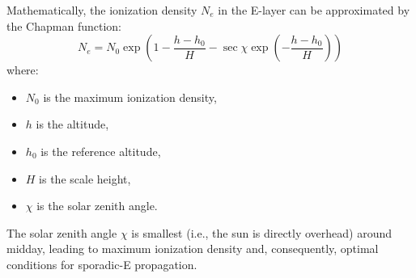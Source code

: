 Mathematically, the ionization density \( N_e \) in the E-layer can be approximated by the Chapman function:
\[ N_e = N_0 \exp\left(1 - \frac{h - h_0}{H} - \sec \chi \exp\left(-\frac{h - h_0}{H}\right)\right) \]
where:
\begin{itemize}
    \item \( N_0 \) is the maximum ionization density,
    \item \( h \) is the altitude,
    \item \( h_0 \) is the reference altitude,
    \item \( H \) is the scale height,
    \item \( \chi \) is the solar zenith angle.
\end{itemize}

The solar zenith angle \( \chi \) is smallest (i.e., the sun is directly overhead) around midday, leading to maximum ionization density and, consequently, optimal conditions for sporadic-E propagation.

